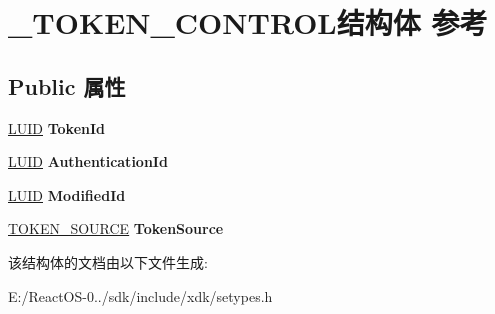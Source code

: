\hypertarget{struct___t_o_k_e_n___c_o_n_t_r_o_l}{}\section{\+\_\+\+T\+O\+K\+E\+N\+\_\+\+C\+O\+N\+T\+R\+O\+L结构体 参考}
\label{struct___t_o_k_e_n___c_o_n_t_r_o_l}
\subsection*{Public 属性}
\begin{DoxyCompactItemize}
\item 
\mbox{\label{struct___t_o_k_e_n___c_o_n_t_r_o_l_a1e237a7231329705b7c93092d32537a2}} 
\hyperlink{struct___l_u_i_d}{L\+U\+ID} {\bfseries Token\+Id}
\item 
\mbox{\label{struct___t_o_k_e_n___c_o_n_t_r_o_l_a30e4855a92ed774e1beb2d4e52eeaca2}} 
\hyperlink{struct___l_u_i_d}{L\+U\+ID} {\bfseries Authentication\+Id}
\item 
\mbox{\label{struct___t_o_k_e_n___c_o_n_t_r_o_l_adb1fe64738964efb7aa978c6fe1dbfcb}} 
\hyperlink{struct___l_u_i_d}{L\+U\+ID} {\bfseries Modified\+Id}
\item 
\mbox{\label{struct___t_o_k_e_n___c_o_n_t_r_o_l_aed644910d66ac59efb76f247cea7ae40}} 
\hyperlink{struct___t_o_k_e_n___s_o_u_r_c_e}{T\+O\+K\+E\+N\+\_\+\+S\+O\+U\+R\+CE} {\bfseries Token\+Source}
\end{DoxyCompactItemize}


该结构体的文档由以下文件生成\+:\begin{DoxyCompactItemize}
\item 
E\+:/\+React\+O\+S-\/0../sdk/include/xdk/setypes.\+h\end{DoxyCompactItemize}
